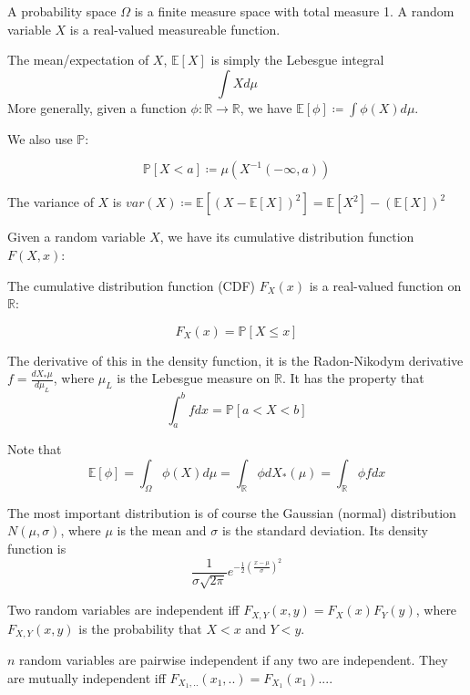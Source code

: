 \documentclass[main.tex]{subfiles}
\begin{document}
\begin{defintion}

A probability space $\Omega$ is a finite measure space with total measure 1. A random variable $X$ is a real-valued measureable function.
\end{defintion}


\begin{definition}
The mean/expectation of $X$, $\mathbb{E}[X]$ is simply the Lebesgue integral 
$$
\int X d\mu
$$
More generally, given a function $\phi: \mathbb{R} \rightarrow \mathbb{R}$, we have $\mathbb{E}[\phi] \coloneqq \int \phi(X) d\mu$. 
\end{definition}

We also use $\mathbb{P}$:
\begin{definition}
$$
\mathbb{P}[X < a] \coloneqq \mu (X^{-1}(-\infty, a))
$$
\end{definition}
\begin{definition}
The variance of $X$ is $var(X) \coloneqq \mathbb{E}[(X - \mathbb{E}[X])^2] = \mathbb{E}[X^2] - (\mathbb{E}[X])^2$
\end{definition}

Given a random variable $X$, we have its cumulative distribution function $F(X,x)$:

\begin{definition}
The cumulative distribution function (CDF) $F_X(x)$ is a real-valued function on $\mathbb{R}$: 

$$
F_X(x) = \mathbb{P}[X \leq x]
$$

\end{definition}

The derivative of this in the density function, it is the Radon-Nikodym derivative $f = \frac{d X_*\mu}{d \mu_{L}}$, where $\mu_{L}$ is the Lebesgue measure on $\mathbb{R}$. It has the property that
$$
\int_a ^b f dx = \mathbb{P}[a < X < b]
$$

Note that 
$$
\mathbb{E}[\phi] = \int_\Omega \phi(X) d\mu = \int_\mathbb{R} \phi d X_*(\mu) = \int_\mathbb{R} \phi f dx
$$

\begin{example}
The most important distribution is of course the Gaussian (normal) distribution $N(\mu, \sigma)$, where $\mu$ is the mean and $\sigma$ is the standard deviation. Its density function is 
$$
\frac{1}{\sigma \sqrt{2\pi}} e^{-\frac{1}{2} (\frac{x-\mu}{\sigma} )^2}
$$

\end{example}


\begin{definition}

Two random variables are independent iff $F_{X,Y}(x,y) = F_X(x) F_Y(y)$, where $F_{X,Y}(x,y)$ is the probability that $X < x$ and $Y < y$. 

$n$ random variables are pairwise independent if any two are independent. They are mutually independent iff $F_{X_1, ..}(x_1, ..) = F_{X_1}(x_1) ...$.
\end{definition}
\end{document}
